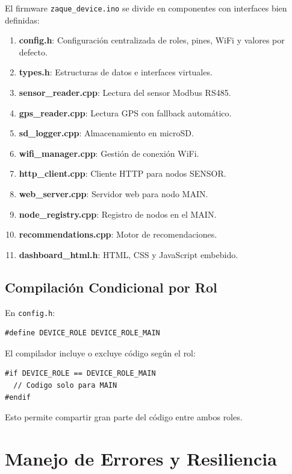 \documentclass[journal]{IEEEtran}
\begin{document}
El firmware \texttt{zaque\_device.ino} se divide en componentes con interfaces bien definidas:

\begin{enumerate}
\item \textbf{config.h}: Configuración centralizada de roles, pines, WiFi y valores por defecto.
\item \textbf{types.h}: Estructuras de datos e interfaces virtuales.
\item \textbf{sensor\_reader.cpp}: Lectura del sensor Modbus RS485.
\item \textbf{gps\_reader.cpp}: Lectura GPS con fallback automático.
\item \textbf{sd\_logger.cpp}: Almacenamiento en microSD.
\item \textbf{wifi\_manager.cpp}: Gestión de conexión WiFi.
\item \textbf{http\_client.cpp}: Cliente HTTP para nodos SENSOR.
\item \textbf{web\_server.cpp}: Servidor web para nodo MAIN.
\item \textbf{node\_registry.cpp}: Registro de nodos en el MAIN.
\item \textbf{recommendations.cpp}: Motor de recomendaciones.
\item \textbf{dashboard\_html.h}: HTML, CSS y JavaScript embebido.
\end{enumerate}

\subsection{Compilación Condicional por Rol}

En \texttt{config.h}:

\begin{lstlisting}
#define DEVICE_ROLE DEVICE_ROLE_MAIN
\end{lstlisting}

El compilador incluye o excluye código según el rol:

\begin{lstlisting}
#if DEVICE_ROLE == DEVICE_ROLE_MAIN
  // Codigo solo para MAIN
#endif
\end{lstlisting}

Esto permite compartir gran parte del código entre ambos roles.

\section{Manejo de Errores y Resiliencia}
\end{document}

